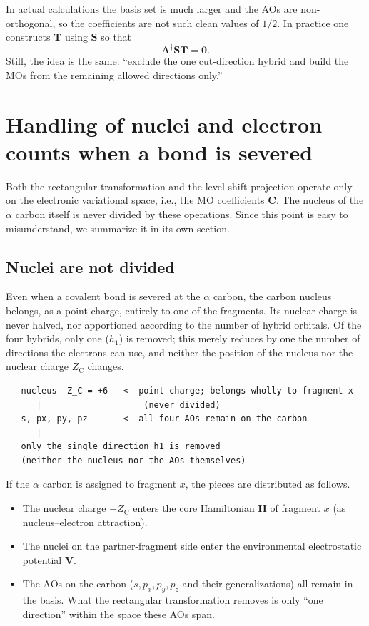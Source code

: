 \documentclass[11pt]{article}
\newcommand{\Hcore}{\mathbf H}
\newcommand{\Venv}{\mathbf V}
\newcommand{\Smat}{\mathbf S}
\newcommand{\Amat}{\mathbf A}
\newcommand{\Tmat}{\mathbf T}
\newcommand{\Cmat}{\mathbf C}
\begin{document}
In actual calculations the basis set is much larger and the AOs are
non-orthogonal, so the coefficients are not such clean values of
\(1/2\). In practice one constructs \(\Tmat\) using \(\Smat\) so that
\[
  \Amat^\dagger\Smat\Tmat=\mathbf 0 .
\]
Still, the idea is the same: ``exclude the one cut-direction hybrid and
build the MOs from the remaining allowed directions only.''

\section{Handling of nuclei and electron counts when a bond is severed}

Both the rectangular transformation and the level-shift projection
operate only on the electronic variational space, i.e., the MO
coefficients \(\Cmat\). The nucleus of the \(\alpha\) carbon itself is
never divided by these operations. Since this point is easy to
misunderstand, we summarize it in its own section.

\subsection{Nuclei are not divided}

Even when a covalent bond is severed at the \(\alpha\) carbon, the
carbon nucleus belongs, as a point charge, entirely to one of the
fragments. Its nuclear charge is never halved, nor apportioned
according to the number of hybrid orbitals. Of the four hybrids, only
one (\(h_1\)) is removed; this merely reduces by one the number of
directions the electrons can use, and neither the position of the
nucleus nor the nuclear charge \(Z_{\mathrm C}\) changes.

\begin{verbatim}
   nucleus  Z_C = +6   <- point charge; belongs wholly to fragment x
      |                    (never divided)
   s, px, py, pz       <- all four AOs remain on the carbon
      |
   only the single direction h1 is removed
   (neither the nucleus nor the AOs themselves)
\end{verbatim}

If the \(\alpha\) carbon is assigned to fragment \(x\), the pieces are
distributed as follows.

\begin{itemize}
\item The nuclear charge \(+Z_{\mathrm C}\) enters the core Hamiltonian
      \(\Hcore\) of fragment \(x\) (as nucleus--electron attraction).
\item The nuclei on the partner-fragment side enter the environmental
      electrostatic potential \(\Venv\).
\item The AOs on the carbon (\(s,p_x,p_y,p_z\) and their
      generalizations) all remain in the basis. What the rectangular
      transformation removes is only ``one direction'' within the space
      these AOs span.
\end{itemize}
\end{document}
